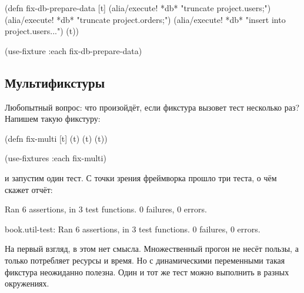 \else

\begin{english}
  \begin{clojure}
(defn fix-db-prepare-data [t]
  (alia/execute! *db* "truncate project.users;")
  (alia/execute! *db* "truncate project.orders;")
  (alia/execute! *db* "insert into project.users...")
  (t))

(use-fixture :each fix-db-prepare-data)
  \end{clojure}
\end{english}

\fi

\subsection{Мультификстуры}

\label{multi-fixture}


Любопытный вопрос: что произойдёт, если фикстура вызовет тест несколько раз?
Напишем такую фикстуру:

\begin{english}
  \begin{clojure}
(defn fix-multi [t]
  (t) (t) (t))

(use-fixtures :each fix-multi)
  \end{clojure}
\end{english}

\noindent
и запустим один тест. С точки зрения фреймворка прошло три теста, о чём скажет
отчёт:

\ifx\devicetype\mobile

\begin{english}
  \begin{text}
Ran 6 assertions, in 3 test functions.
0 failures, 0 errors.
  \end{text}
\end{english}

\else

\begin{english}
  \begin{text}
book.util-test: Ran 6 assertions, in 3 test functions.
0 failures, 0 errors.
  \end{text}
\end{english}

\fi

На первый взгляд, в этом нет смысла. Множественный прогон не несёт пользы, а
только потребляет ресурсы и время. Но с динамическими переменными такая фикстура
неожиданно полезна. Один и тот же тест можно выполнить в разных окружениях.

